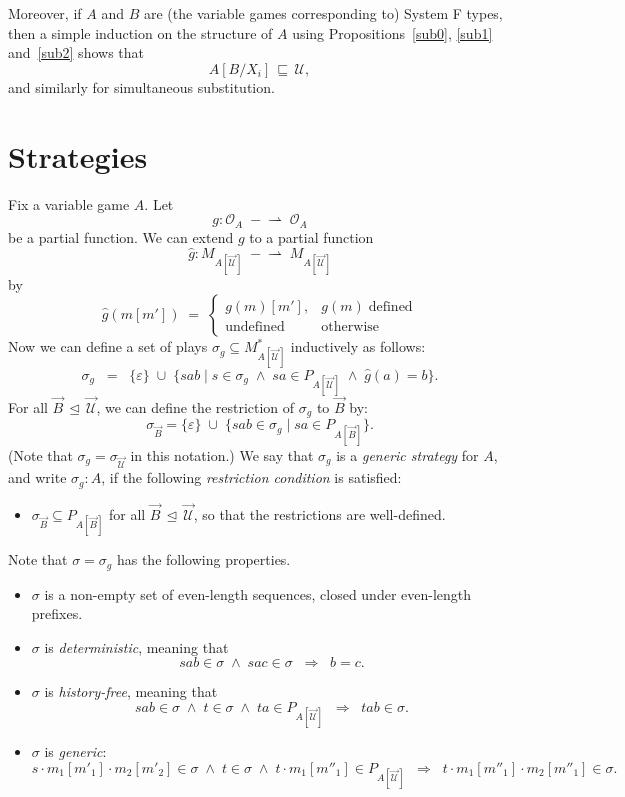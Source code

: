 \documentclass[a4paper,11pt]{article}
\newcommand{\UU}{\mathcal{U}}
\newcommand{\domapprox}{\, \sqsubseteq \,}
\newcommand{\ginc}{\, \trianglelefteq \,}
\newcommand{\Occ}{\mathcal{O}}
\newcommand{\pfnarrow}{\; - \! \! \! \rightharpoonup \;}
\begin{document}
Moreover, if $A$ and $B$ are (the variable games corresponding to)
System F types, then a simple induction on the structure of $A$ using
Propositions~\ref{sub0}, \ref{sub1} and~\ref{sub2} shows
that
\[ A[B/X_{i}] \domapprox \UU , \]
and similarly for simultaneous substitution.



\section{Strategies}


Fix a variable game $A$. Let
\[ g : \Occ_A \pfnarrow \Occ_A \]
be a partial
function. We can extend $g$ to a partial function
\[ \hat{g} : M_{A[\vec{\UU}]} \pfnarrow M_{A[\vec{\UU}]} \]
by
\[
\hat{g}(m[m']) \; = \;  \left\{ \begin{array}{ll}
g(m)[m'], & g(m) \; \mbox{defined} \\
\mbox{undefined} & \mbox{otherwise}
\end{array} \right.
\]
Now we can define a set of plays $\sigma_g \subseteq M_{A[\vec{\UU}]}^{\ast}$
inductively as follows:
\[ \sigma_g \;\; = \;\; \{ \varepsilon \} \; \cup \; \{ sab \mid s \in \sigma_g
\; \wedge \; sa \in P_{A[\vec{\UU}]} \; \wedge \; \hat{g}(a) = b \}
  . \]
For all $\vec{B} \ginc \vec{\UU}$, we can define the restriction of
$\sigma_g$ to $\vec{B}$ by:
\[ \sigma_{\vec{B}} = \{ \varepsilon \} \; \cup \; \{ sab \in \sigma_g \mid sa
\in P_{A[\vec{B}]} \} . \]
(Note that
$\sigma_g = \sigma_{\vec{\UU}}$ in this notation.)
We say that $\sigma_g$ is a \emph{generic strategy} for $A$, and write
$\sigma_g : A$, if the following \emph{restriction condition} is satisfied:
\begin{itemize}
\item $\sigma_{\vec{B}} \subseteq P_{A[\vec{B}]}$ for all $\vec{B}
  \ginc \vec{\UU}$, so that the restrictions are well-defined.
\end{itemize}
Note that $\sigma = \sigma_g$ has the following properties.
\begin{itemize}
\item $\sigma$ is a non-empty set of even-length sequences, closed
  under even-length prefixes.
\item $\sigma$ is \emph{deterministic}, meaning that
\[ sab \in \sigma \; \wedge \; sac \in \sigma \;\; \Rightarrow \;\; b
= c. \]
\item $\sigma$ is \emph{history-free}, meaning that
\[ sab \in \sigma \; \wedge \; t \in \sigma \; \wedge \; ta \in P_{A[\vec{\UU}]}
\;\; \Rightarrow \;\; tab \in \sigma .\]
\item $\sigma$ is \emph{generic}:
\[ s \cdot m_1[m'_1] \cdot m_2[m'_2] \in \sigma \; \wedge \; t
\in \sigma \; \wedge \; t \cdot m_1[m''_1] \in P_{A[\vec{\UU}]}
\;\; \Rightarrow \;\; t \cdot m_1[m''_1] \cdot m_2[m''_1] \in
\sigma . \]
\end{itemize}
\end{document}
